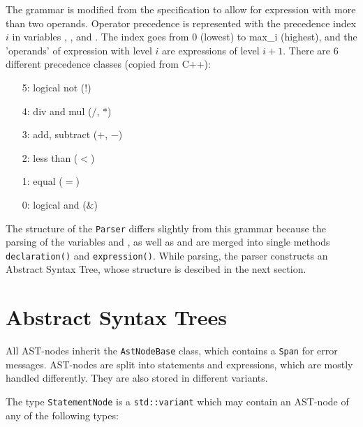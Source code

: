 \documentclass[a4paper]{article}
\newcommand*{\code}[1]{\texttt{#1}}
\begin{document}
The grammar is modified from the specification to allow 
for expression with more than two operands. Operator 
precedence is represented with the precedence index $i$ in 
variables  , ,
 and . The index goes 
from $0$ (lowest) to max\_i (highest), and the 'operands' 
of expression with level $i$ are expressions of level $i+1$.
There are 6 different precedence classes (copied from C++):
\begin{itemize}
  \item[5:] logical not ($!$)
  \item[4:] div and mul ($/$, $*$)
  \item[3:] add, subtract ($+$, $-$)
  \item[2:] less than ($<$)
  \item[1:] equal ($=$)
  \item[0:] logical and ($\&$)
\end{itemize}

The structure of the \code{Parser} differs slightly from this grammar 
because the parsing of the variables  and , as well 
as  and  are merged into single 
methods \code{declaration()} and \code{expression()}.
While parsing, the parser constructs an Abstract Syntax Tree, 
whose structure is descibed in the next section.

\clearpage
\section{Abstract Syntax Trees}
\label{sect:AST}

All AST-nodes inherit the \code{AstNodeBase} class, which contains 
a \code{Span} for error messages. AST-nodes are split into 
statements and expressions, which are mostly handled differently.
They are also stored in different variants.

The type \code{StatementNode} is a 
\code{std::variant} which may contain an AST-node of any of the 
following types:
\end{document}
